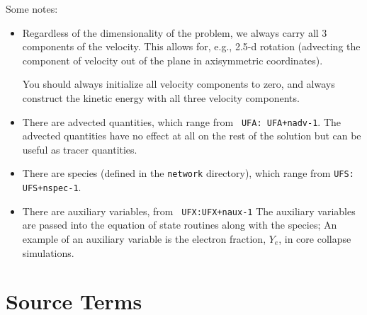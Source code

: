 Some notes:
\begin{itemize}
\item Regardless of the dimensionality of the problem, we always carry
  all 3 components of the velocity.  This allows for, e.g., 2.5-d
  rotation (advecting the component of velocity out of the plane in
  axisymmetric coordinates).  

  You should always initialize all velocity components to zero, and
  always construct the kinetic energy with all three velocity components.

\item There are  advected quantities, which range from {\tt
  UFA: UFA+nadv-1}.  The advected quantities have no effect at all on
  the rest of the solution but can be useful as tracer quantities.

\item There are  species (defined in the {\tt network}
  directory), which range from {\tt UFS: UFS+nspec-1}.

\item There are  auxiliary variables, from {\tt
  UFX:UFX+naux-1} The auxiliary variables are passed into the equation
  of state routines along with the species; An example of an auxiliary
  variable is the electron fraction, $Y_e$, in core collapse simulations.
\end{itemize}


\section{Source Terms}

